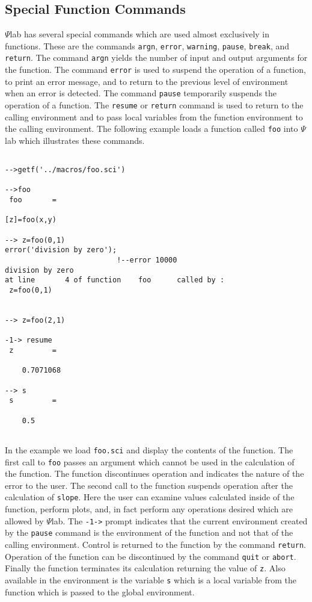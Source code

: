 \subsection{Special Function Commands}
$\Psi$lab has several special commands which are used almost exclusively
in functions.  These are the commands 
{\tt argn}, 
{\tt error}, 
{\tt warning}, 
{\tt pause},
{\tt break}, and
{\tt return}.  
The command {\tt argn} yields the number of input
and output arguments for the function.  The command {\tt error}
is used to suspend the operation of a function, to print an error message,
and to return to the
previous level of environment when an error is detected.  
The command {\tt pause} temporarily suspends the operation of a function.
The {\tt resume} or {\tt return} command is used to return to 
the calling environment and to pass local
variables from the function environment to the calling environment. 
The following example loads a function called {\tt foo} into $\Psi$lab which 
illustrates these commands.
\begin{verbatim}
 
-->getf('../macros/foo.sci')
 
-->foo
 foo       =
 
[z]=foo(x,y)
 
--> z=foo(0,1)
error('division by zero');
                          !--error 10000 
division by zero                                                                
at line       4 of function    foo      called by :  
 z=foo(0,1)
 
 
--> z=foo(2,1)
 
-1-> resume
 z         =
 
    0.7071068  
 
--> s
 s         =
 
    0.5  
 
\end{verbatim}
In the example we load {\tt foo.sci} and display the contents of the
function.  The first call to {\tt foo} passes an argument which cannot
be used in the calculation of the function.  The function discontinues operation
and indicates the nature of the error to the user.  The second call
to the function suspends operation after the calculation of {\tt slope}.
Here the user can examine values calculated inside of the function,
perform plots, and, in fact perform any operations desired which are
allowed by $\Psi$lab.  The {\tt -1->} prompt indicates that the current
environment created by the {\tt pause} command is the environment 
of the function and not that of the calling environment.  Control is 
returned to the function by the command {\tt return}.  Operation of the
function can be discontinued by the command {\tt quit} or {\tt abort}.
Finally the function terminates its calculation returning the
value of {\tt z}.  Also available in the environment is the variable
{\tt s} which is a local variable from the function which is passed to
the global environment.

